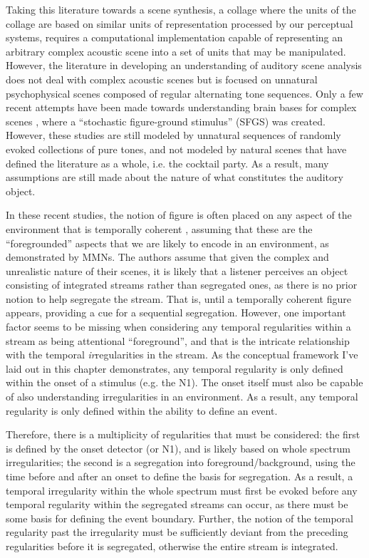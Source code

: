 \documentclass[a4paper,10pt,final]{ThesisStyle}
\begin{document}
Taking this literature towards a scene synthesis, a collage where the units of the collage are based on similar units of representation processed by our perceptual systems, requires a computational implementation capable of representing an arbitrary complex acoustic scene into a set of units that may be manipulated.  However, the literature in developing an understanding of auditory scene analysis does not deal with complex acoustic scenes but is focused on unnatural psychophysical scenes composed of regular alternating tone sequences.  Only a few recent attempts have been made towards understanding brain bases for complex scenes \cite{Teki2011a,Teki2013}, where a ``stochastic figure-ground stimulus'' (SFGS) was created.  However, these studies are still modeled by unnatural sequences of randomly evoked collections of pure tones, and not modeled by natural scenes that have defined the literature as a whole, i.e. the cocktail party.  As a result, many assumptions are still made about the nature of what constitutes the auditory object.  

In these recent studies, the notion of figure is often placed on any aspect of the environment that is temporally coherent \cite{Shamma2011,Teki2011a,Teki2013}, assuming that these are the ``foregrounded'' aspects that we are likely to encode in an environment, as demonstrated by MMNs.  The authors assume that given the complex and unrealistic nature of their scenes, it is likely that a listener perceives an object consisting of integrated streams rather than segregated ones, as there is no prior notion to help segregate the stream.  That is, until a temporally coherent figure appears, providing a cue for a sequential segregation.  However, one important factor seems to be missing when considering any temporal regularities within a stream as being attentional ``foreground'', and that is the intricate relationship with the temporal \textit{ir}regularities in the stream.  As the conceptual framework I've laid out in this chapter demonstrates, any temporal regularity is only defined within the onset of a stimulus (e.g. the N1).  The onset itself must also be capable of also understanding irregularities in an environment.  As a result, any temporal regularity is only defined within the ability to define an event.  

Therefore, there is a multiplicity of regularities that must be considered: the first is defined by the onset detector (or N1), and is likely based on whole spectrum irregularities; the second is a segregation into foreground/background, using the time before and after an onset to define the basis for segregation.  As a result, a temporal irregularity within the whole spectrum must first be evoked before any temporal regularity within the segregated streams can occur, as there must be some basis for defining the event boundary.  Further, the notion of the temporal regularity past the irregularity must be sufficiently deviant from the preceding regularities before it is segregated, otherwise the entire stream is integrated.  
\end{document}
